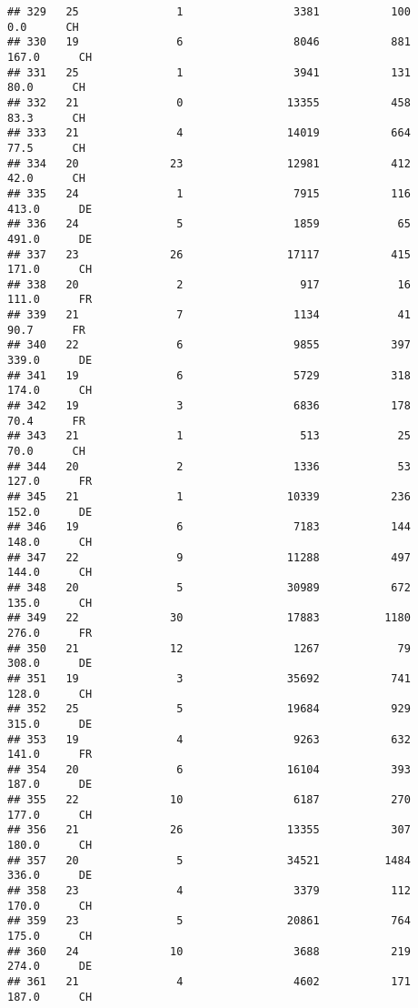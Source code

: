 \documentclass[
]{article}
\begin{document}
\begin{verbatim}
## 329   25               1                 3381           100      0.0      CH
## 330   19               6                 8046           881    167.0      CH
## 331   25               1                 3941           131     80.0      CH
## 332   21               0                13355           458     83.3      CH
## 333   21               4                14019           664     77.5      CH
## 334   20              23                12981           412     42.0      CH
## 335   24               1                 7915           116    413.0      DE
## 336   24               5                 1859            65    491.0      DE
## 337   23              26                17117           415    171.0      CH
## 338   20               2                  917            16    111.0      FR
## 339   21               7                 1134            41     90.7      FR
## 340   22               6                 9855           397    339.0      DE
## 341   19               6                 5729           318    174.0      CH
## 342   19               3                 6836           178     70.4      FR
## 343   21               1                  513            25     70.0      CH
## 344   20               2                 1336            53    127.0      FR
## 345   21               1                10339           236    152.0      DE
## 346   19               6                 7183           144    148.0      CH
## 347   22               9                11288           497    144.0      CH
## 348   20               5                30989           672    135.0      CH
## 349   22              30                17883          1180    276.0      FR
## 350   21              12                 1267            79    308.0      DE
## 351   19               3                35692           741    128.0      CH
## 352   25               5                19684           929    315.0      DE
## 353   19               4                 9263           632    141.0      FR
## 354   20               6                16104           393    187.0      DE
## 355   22              10                 6187           270    177.0      CH
## 356   21              26                13355           307    180.0      CH
## 357   20               5                34521          1484    336.0      DE
## 358   23               4                 3379           112    170.0      CH
## 359   23               5                20861           764    175.0      CH
## 360   24              10                 3688           219    274.0      DE
## 361   21               4                 4602           171    187.0      CH

\end{verbatim}
\end{document}
